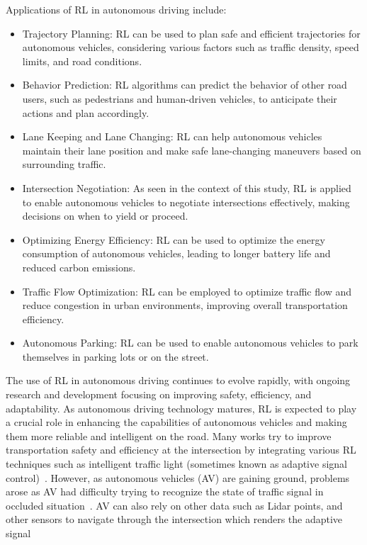 Applications of RL in autonomous driving include:
\begin{itemize}
    \item Trajectory Planning: RL can be used to plan safe and efficient trajectories for autonomous vehicles, considering various factors such as traffic density, speed limits, and road conditions.
    \item Behavior Prediction: RL algorithms can predict the behavior of other road users, such as pedestrians and human-driven vehicles, to anticipate their actions and plan accordingly.
    \item Lane Keeping and Lane Changing: RL can help autonomous vehicles maintain their lane position and make safe lane-changing maneuvers based on surrounding traffic.
    \item Intersection Negotiation: As seen in the context of this study, RL is applied to enable autonomous vehicles to negotiate intersections effectively, making decisions on when to yield or proceed.
    \item Optimizing Energy Efficiency: RL can be used to optimize the energy consumption of autonomous vehicles, leading to longer battery life and reduced carbon emissions.
    \item Traffic Flow Optimization: RL can be employed to optimize traffic flow and reduce congestion in urban environments, improving overall transportation efficiency.
    \item Autonomous Parking: RL can be used to enable autonomous vehicles to park themselves in parking lots or on the street.
\end{itemize}
The use of RL in autonomous driving continues to evolve rapidly, with ongoing research and development focusing on improving safety, efficiency, and adaptability.
As autonomous driving technology matures, RL is expected to play a crucial role in enhancing the capabilities of autonomous vehicles and making them more reliable and intelligent on the road.
Many works try to improve transportation safety and
efficiency at the intersection by integrating various RL
techniques such as intelligent traffic light (sometimes known
as adaptive signal control)~\cite{yang2022inductive, wang2021adaptive, essa2020selflearning}.
However, as
autonomous vehicles (AV) are gaining ground, problems
arose as AV had difficulty trying to recognize the state of
traffic signal in occluded situation~\cite{Isele2017}.
AV can also rely on
other data such as Lidar points, and other sensors to navigate
through the intersection which renders the adaptive signal
